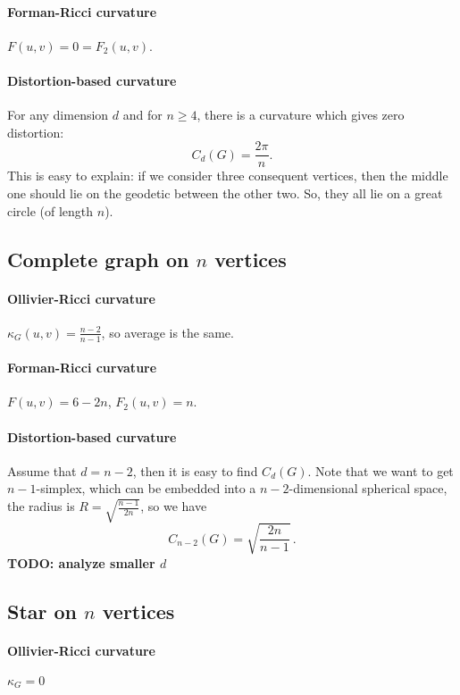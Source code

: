 \documentclass{article}
\begin{document}
\paragraph{Forman-Ricci curvature} $F(u,v) = 0 = F_2(u,v)$.

\paragraph{Distortion-based curvature} For any dimension $d$ and for $n \ge 4$, there is a curvature which gives zero distortion:
\[
C_d(G) = \frac{2\pi}{n}.
\]
This is easy to explain: if we consider three consequent vertices, then the middle one should lie on the geodetic between the other two. So, they all lie on a great circle (of length $n$).

\subsection{Complete graph on $n$ vertices}

\paragraph{Ollivier-Ricci curvature} 
        
$\kappa_G(u,v) = \frac{n-2}{n-1}$, so average is the same.

\paragraph{Forman-Ricci curvature} $F(u,v) = 6 - 2n$, $F_2(u,v) = n$.

\paragraph{Distortion-based curvature} Assume that $d = n-2$, then it is easy to find $C_d(G)$. Note that we want to get $n-1$-simplex, which can be embedded into a $n-2$-dimensional spherical space, the radius is $R = \sqrt{\frac{n-1}{2n}}$, so we have
\[
C_{n-2}(G) = \sqrt{\frac{2n}{n-1}}\,.
\]
\textbf{TODO: analyze smaller $d$}

\subsection{Star on $n$ vertices}

\paragraph{Ollivier-Ricci curvature} $\kappa_G = 0$
\end{document}

